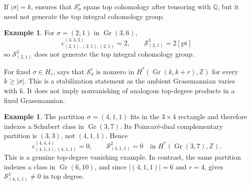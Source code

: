 \documentclass[11pt, reqno]{amsart}
\numberwithin{equation}{section}
\theoremstyle{definition}
\newtheorem{example}[theorem]{Example}
\DeclareMathOperator{\Gr}{Gr}
\newcommand{\s}{\sigma}
\begin{document}
\begin{appendix}
If $|\s|=k$,  ensures that $\mathcal S_\sigma^r$ spans top cohomology after tensoring with $\mathbb Q$, but it need not
generate the top integral cohomology group.

\begin{example}\label{ex: corrected integral comparison}
For $\sigma=(2,1)$  in $\Gr(3,6)$,
\[
c_{(2,1),(2,1),(2,1)}^{(3,3,3)}=2,
\qquad
\mathcal S_{(2,1)}^3=2[\mathrm{pt}]
\]
so $ \mathcal S_{(2,1)}^3$ does not generate the top integral cohomology group.
\end{example}

For fixed $\sigma\in H_r$,  says that
$\mathcal S_\sigma^r$ is nonzero in $H^*(\Gr(k,k+r),\mathbb Z)$ for every
$k\geq|\sigma|$.  This is a stabilization statement as the ambient
Grassmannian varies with $k$. It does not imply nonvanishing of analogous top-degree products in a fixed Grassmannian.

\begin{example}\label{ex: corrected vanishing comparison}
The partition $\sigma=(4,1,1)$ fits in the $3\times4$ rectangle and therefore
indexes a Schubert class in $\Gr(3,7)$.  Its Poincar\'e-dual complementary
partition is $(3,3)$, not $(4,1,1)$.  Hence
\[
c_{(4,1,1),(4,1,1)}^{(4,4,4)}=0,
\qquad
\mathcal S_{(4,1,1)}^2=0
\quad\text{in }H^*(\Gr(3,7),\mathbb Z).
\]
This is a genuine top-degree vanishing example.  In contrast, the same
partition indexes a class in $\Gr(6,10)$, and since $|(4,1,1)|=6$ and $r=4$,
 gives
$\mathcal S_{(4,1,1)}^4\neq0$ in top degree.
\end{example}

\end{appendix}

	
	
\end{document}
